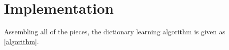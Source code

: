\documentclass{article}
\begin{document}



\section{Implementation}

Assembling all of the pieces, the dictionary learning algorithm is given as \autoref{algorithm}.
\end{document}
